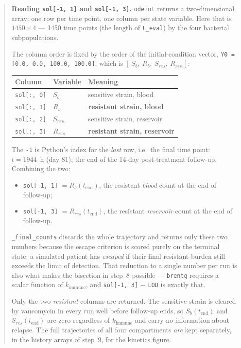 \documentclass[11pt]{article}
\begin{document}
\begin{enumerate}
\begin{quote}
\small
\textbf{Reading \texttt{sol[-1, 1]} and \texttt{sol[-1, 3]}.}
\texttt{odeint} returns a two-dimensional array: one row per time point,
one column per state variable. Here that is $1450 \times 4$ --- 1450 time
points (the length of \texttt{t\_eval}) by the four bacterial
subpopulations.

The column order is fixed by the order of the initial-condition vector,
\texttt{Y0 = [0.0, 0.0, 100.0, 100.0]}, which is
$[\,S_b,\ R_b,\ S_{res},\ R_{res}\,]$:

\begin{center}
\begin{tabular}{@{}lll@{}}
\hline
Column & Variable & Meaning \\
\hline
\texttt{sol[:, 0]} & $S_b$     & sensitive strain, blood \\
\texttt{sol[:, 1]} & $R_b$     & \textbf{resistant strain, blood} \\
\texttt{sol[:, 2]} & $S_{res}$ & sensitive strain, reservoir \\
\texttt{sol[:, 3]} & $R_{res}$ & \textbf{resistant strain, reservoir} \\
\hline
\end{tabular}
\end{center}

The \texttt{-1} is Python's index for the \emph{last} row, i.e.\ the final
time point: $t = 1944$~h (day 81), the end of the 14-day post-treatment
follow-up. Combining the two:

\begin{itemize}
\item \texttt{sol[-1, 1]} $= R_b(t_{\mathrm{end}})$, the resistant
\emph{blood} count at the end of follow-up;
\item \texttt{sol[-1, 3]} $= R_{res}(t_{\mathrm{end}})$, the resistant
\emph{reservoir} count at the end of follow-up.
\end{itemize}

\texttt{\_final\_counts} discards the whole trajectory and returns only
these two numbers because the escape criterion is scored purely on the
terminal state: a simulated patient has \emph{escaped} if their final
resistant burden still exceeds the limit of detection. That reduction to a
single number per run is also what makes the bisection in step~8 possible
--- \texttt{brentq} requires a scalar function of $k_{\mathrm{immune}}$,
and \texttt{sol[-1, 3]} $-$ \texttt{LOD} is exactly that.

Only the two \emph{resistant} columns are returned. The sensitive strain is
cleared by vancomycin in every run well before follow-up ends, so
$S_b(t_{\mathrm{end}})$ and $S_{res}(t_{\mathrm{end}})$ are zero
regardless of $k_{\mathrm{immune}}$ and carry no information about
relapse. The full trajectories of all four compartments \emph{are} kept
separately, in the history arrays of step~9, for the kinetics figure.
\end{quote}


\end{enumerate}
\end{document}
